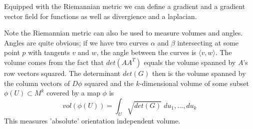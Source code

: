 Equipped with the Riemannian metric we can define a gradient and a gradient vector field for functions as well as divergience and a laplacian. 

Note the Riemannian metric can also be used to measure volumes and angles. Angles are quite obvious; if we have two curves $\alpha$ and $\beta$ intersecting at some point $p$ with tangents $v$ and $w$, the angle between the curves is $\langle v,w\rangle$. The volume comes from the fact that $det(A A^T)$ equals the volume spanned by $A$'s row vectors squared. The determinant $det(G)$ then is the volume spanned by the column vectors of $D\phi$ squared and the $k$-dimensional volume of some subset $\phi(U) \subset M^k$ covered by a map $\phi$ is
\[vol(\phi(U))= \int_U \sqrt{det(G)}\;du_1,...,du_k\]
This measures 'absolute' orientation independent volume.



